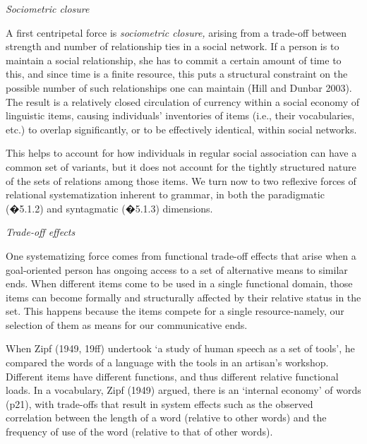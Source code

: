 \textit{Sociometric closure}



A first centripetal force is \textit{sociometric closure, }arising 
from a trade-off between strength and number of relationship ties in a 
social network. If a person is to maintain a social relationship, she 
has to commit a certain amount of time to this, and since time is a 
finite resource, this puts a structural constraint on the possible 
number of such relationships one can maintain (Hill and Dunbar 2003). 
The result is a relatively closed circulation of currency within a 
social economy of linguistic items, causing individuals' inventories of 
items (i.e., their vocabularies, etc.) to overlap significantly, or to 
be effectively identical, within social networks.



This helps to account for how individuals in regular social association 
can have a common set of variants, but it does not account for the 
tightly structured nature of the sets of relations among those items. We 
turn now to two reflexive forces of relational systematization inherent 
to grammar, in both the paradigmatic (�5.1.2) and syntagmatic (�5.1.3) 
dimensions.



\textit{Trade-off effects}



One systematizing force comes from functional trade-off effects that 
arise when a goal-oriented person has ongoing access to a set of 
alternative means to similar ends. When different items come to be used 
in a single functional domain, those items can become formally and 
structurally affected by their relative status in the set. This happens 
because the items compete for a single resource-namely, our selection of 
them as means for our communicative ends. 



When Zipf (1949, 19ff) undertook \textquoteleft a study of human speech as a set of 
tools', he compared the words of a language with the tools in an 
artisan's workshop. Different items have different functions, and thus 
different relative functional loads. In a vocabulary, Zipf (1949) 
argued, there is an \textquoteleft internal economy' of words (p21), with trade-offs 
that result in system effects such as the observed correlation between 
the length of a word (relative to other words) and the frequency of use 
of the word (relative to that of other words). 



